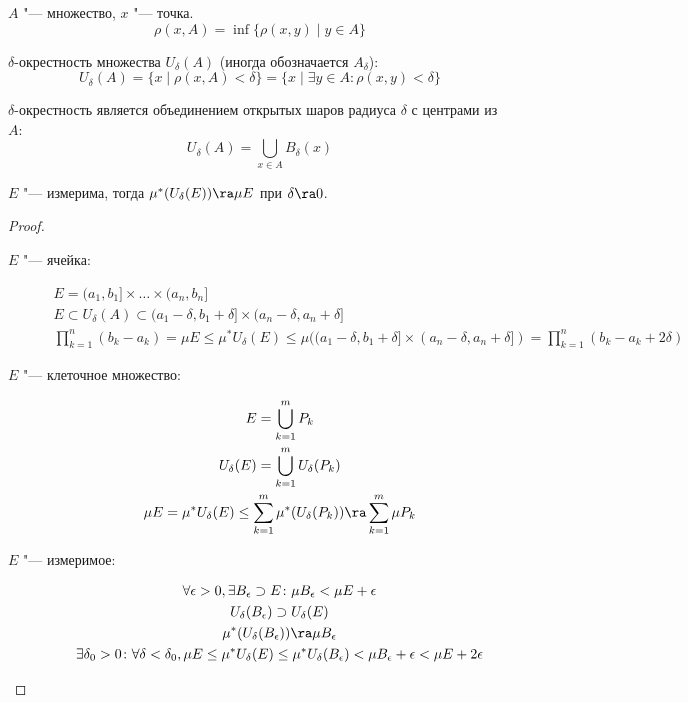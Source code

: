 
\begin{Def}
	$A$ "--- множество, $x$ "--- точка.
	\[ \rho(x, A) = \inf \{\rho(x, y) \mid y \in A \} \]
\end{Def}

\begin{Def}
	$\delta$-окрестность множества $U_\delta(A)$ (иногда обозначается $A_\delta$):
	\[ U_\delta(A) = \{ x \mid \rho(x, A) < \delta\} = \{x \mid \exists y \in A\colon \rho(x, y) < \delta\} \]
\end{Def}
\begin{Rem}
	$\delta$-окрестность является объединением открытых шаров радиуса $\delta$ с центрами из $A$:
	\[ U_\delta(A) = \bigcup_{x \in A} B_\delta(x) \]
\end{Rem}

\begin{theorem}
	$E$ "--- измерима, тогда $\mu^*(U_\delta(E)) \ra \mu E$ при $\delta \ra 0$.
\end{theorem}
\begin{proof}
	\begin{description}
	\item[$E$ "--- ячейка:]
		\begin{gather*}
			E = (a_1, b_1] \times \dots \times (a_n, b_n] \\
			E \subset U_\delta(A) \subset (a_1 - \delta, b_1 + \delta] \times (a_n - \delta, a_n + \delta] \\
			\prod_{k=1}^n (b_k - a_k) = \mu E \le \mu^* U_\delta(E) \le \mu((a_1 - \delta, b_1 + \delta] \times (a_n - \delta, a_n + \delta])
			= \prod_{k=1}^n (b_k - a_k + 2\delta)
		\end{gather*}

	\item[$E$ "--- клеточное множество:]
		\begin{gather*}
			E = \bigcup_{k=1}^m P_k \\
			U_\delta(E) = \bigcup_{k=1}^m U_\delta(P_k) \\
			\mu E = \mu^* U_\delta(E) \le \sum_{k=1}^m \mu^*(U_\delta(P_k)) \ra \sum_{k=1}^m \mu P_k
		\end{gather*}

	\item[$E$ "--- измеримое:]
		\begin{gather*}
			\forall \epsilon > 0, \exists B_\epsilon \supset E\colon \mu B_\epsilon < \mu E + \epsilon \\
			U_\delta(B_\epsilon) \supset U_\delta(E) \\
			\mu^*(U_\delta(B_\epsilon)) \ra \mu B_\epsilon \\
			\exists \delta_0 > 0\colon \forall \delta < \delta_0, \mu E \le \mu^* U_\delta(E) \le \mu^* U_\delta(B_\epsilon) < \mu B_\epsilon + \epsilon < \mu E + 2 \epsilon
		\end{gather*}
	\end{description}
\end{proof}

